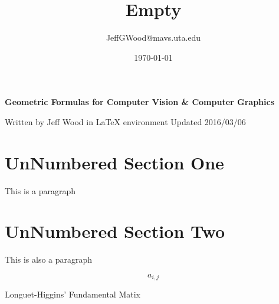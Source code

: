 \documentclass[a4paper,10pt]{article}
\title{Empty}
\author{JeffGWood@mavs.uta.edu}
\date{\today}
\newcommand{\cAij}[2]{\ensuremath{a_{{#1},{#2}}}}
\begin{document}
\maketitle

\Huge\center\textbf{Geometric Formulas for \newline Computer Vision \& \newline Computer Graphics}\newline

\large Written by Jeff Wood in LaTeX environment\newline
\large Updated 2016/03/06 \newline

\normalsize
\flushleft

\section*{UnNumbered Section One}
This is a paragraph
\section*{UnNumbered Section Two}
This is also a paragraph

\begin{equation*}
\cAij{i}{j}
\end{equation*}

Longuet-Higgins' Fundamental Matix ~\cite{Longuet-Higgins}

{}

\end{document}

